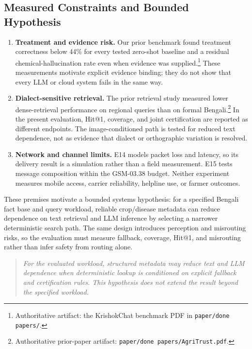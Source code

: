 \documentclass[11pt,a4paper]{article}
\begin{document}
\subsection{Measured Constraints and Bounded Hypothesis}
\label{subsec:three_dependencies}
\begin{enumerate}[leftmargin=1.8em]
    \item \textbf{Treatment and evidence risk.} Our prior benchmark found treatment correctness below 44\% for every tested zero-shot baseline and a residual chemical-hallucination rate even when evidence was supplied.\footnote{Authoritative artifact: the KrishokChat benchmark PDF in \texttt{paper/done papers/}.} These measurements motivate explicit evidence binding; they do not show that every LLM or cloud system fails in the same way.
    \item \textbf{Dialect-sensitive retrieval.} The prior retrieval study measured lower dense-retrieval performance on regional queries than on formal Bengali.\footnote{Authoritative prior-paper artifact: \texttt{paper/done papers/AgriTrust.pdf}.} In the present evaluation, Hit@1, coverage, and joint certification are reported as different endpoints. The image-conditioned path is tested for reduced text dependence, not as evidence that dialect or orthographic variation is resolved.
    \item \textbf{Network and channel limits.} E14 models packet loss and latency, so its delivery result is a simulation rather than a field measurement. E15 tests message composition within the GSM-03.38 budget. Neither experiment measures mobile access, carrier reliability, helpline use, or farmer outcomes.
\end{enumerate}

\noindent These premises motivate a bounded systems hypothesis: for a specified Bengali fact base and query workload, reliable crop/disease metadata can reduce dependence on text retrieval and LLM inference by selecting a narrower deterministic search path. The same design introduces perception and misrouting risks, so the evaluation must measure fallback, coverage, Hit@1, and misrouting rather than infer safety from routing alone.

\begin{quote}
\itshape For the evaluated workload, structured metadata may reduce text and LLM dependence when deterministic lookup is conditioned on explicit fallback and certification rules. This hypothesis does not extend the result beyond the specified workload.
\end{quote}
\end{document}
